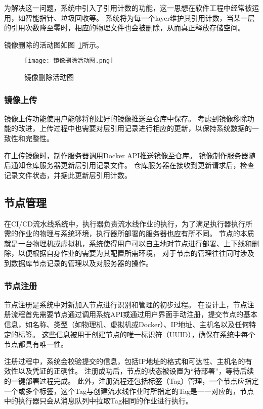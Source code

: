 为解决这一问题，系统中引入了引用计数的功能，这一思想在软件工程中经常被运用，如智能指针、垃圾回收等。
系统将为每一个layer维护其引用计数，当某一层的引用次数降至零时，相应的物理文件也会被删除，从而真正释放存储空间。

镜像删除的活动图如图~\ref{fig:镜像删除活动图}所示。

\begin{figure}[h]
  \centering
  \texttt{[image: 镜像删除活动图.png]}
  \caption{镜像删除活动图}
  \label{fig:镜像删除活动图}
\end{figure}

\subsubsection{镜像上传}
镜像上传功能使用户能够将创建好的镜像推送至仓库中保存。
考虑到镜像移除功能的改进，上传过程中也需要对层引用记录进行相应的更新，以保持系统数据的一致性和完整性。

在上传镜像时，制作服务器调用Docker API推送镜像至仓库。
镜像制作服务器随后通知仓库服务器更新层引用记录文件。
仓库服务器在接收到更新请求后，检查记录文件状态，并据此更新层引用计数。

\subsection{节点管理}
在CI/CD流水线系统中，执行器负责流水线作业的执行，为了满足执行器执行所需的作业的物理与系统环境，执行器所部署的服务器也应有所不同。
节点的本质就是一台物理机或虚拟机，系统使得用户可以自主地对节点进行部署、上下线和删除，以便根据自身作业的需要为其配置所需环境，
对于节点的管理往往同时涉及到数据库节点记录的管理以及对服务器的操作。

\subsubsection{节点注册}
节点注册是系统中对新加入节点进行识别和管理的初步过程。
在设计上，节点注册流程首先需要节点通过调用系统API或通过用户界面手动注册，提交节点的基本信息，如名称、类型（如物理机、虚拟机或Docker）、IP地址、主机名以及任何特定的标签。
这些信息被用于创建节点的唯一标识符（UUID），确保在系统中每个节点都具有唯一性。

注册过程中，系统会校验提交的信息，包括IP地址的格式和可达性、主机名的有效性以及凭证的正确性。
注册成功后，节点的状态被设置为“待部署”，等待后续的一键部署过程完成。
此外，注册流程还包括标签（Tag）管理，一个节点应指定一个或多个标签，这个Tag与创建流水线作业时所指定的Tag是一一对应的，节点中的执行器只会从消息队列中拉取Tag相同的作业进行执行。

